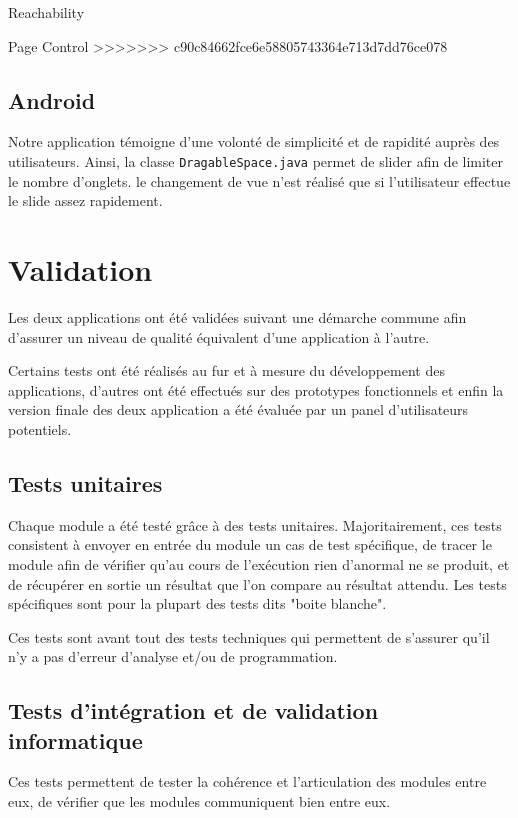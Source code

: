 \documentclass[a4paper, 11px]{article}
\begin{document}
Reachability

Page Control
>>>>>>> c90c84662fce6e58805743364e713d7dd76ce078


\subsection{Android}

Notre application témoigne d'une volonté de simplicité et de rapidité auprès des utilisateurs. Ainsi, la classe \texttt{DragableSpace.java} permet de \og slider \fg afin de limiter le nombre d'onglets. le changement de vue n'est réalisé que si l'utilisateur effectue le slide assez rapidement.



\section{Validation}
Les deux applications ont été validées suivant une démarche commune afin d'assurer un niveau de qualité équivalent d'une application à l'autre.

Certains tests ont été réalisés au fur et à mesure du développement des applications, d'autres ont été effectués sur des prototypes fonctionnels et enfin la version finale des deux application a été évaluée par un panel d'utilisateurs potentiels.

\subsection{Tests unitaires}
Chaque module a été testé grâce à des tests unitaires. Majoritairement, ces tests consistent à envoyer en entrée du module un cas de test spécifique, de tracer le module afin de vérifier qu'au cours de l’exécution rien d'anormal ne se produit, et de récupérer en sortie un résultat que l'on compare au résultat attendu. Les tests spécifiques sont pour la plupart des tests dits "boite blanche".

Ces tests sont avant tout des tests techniques qui permettent de s'assurer qu'il n'y a pas d'erreur d'analyse et/ou de programmation.

\subsection{Tests d'intégration et de validation informatique}
Ces tests permettent de tester la cohérence et l'articulation des modules entre eux, de vérifier que les modules communiquent bien entre eux.
\end{document}
